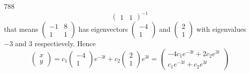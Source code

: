 \documentclass[12pt,a4paper]{article}
\begin{document}
\begin{problem}{788}
\[\begin{pmatrix}
                1& 1
            \end{pmatrix}^{-1}
        \]
        that means $(\begin{smallmatrix}-1& 8\\1& 1\end{smallmatrix})$ has eigenvectors $(\begin{smallmatrix}-4\\1\end{smallmatrix})$ and $(\begin{smallmatrix}2\\1\end{smallmatrix})$ with eigenvalues $-3$ and $3$ respectievely. Hence
        \[
            \begin{pmatrix}
                x\\y
            \end{pmatrix}
            =
            c_1
            \begin{pmatrix}
                -4\\1
            \end{pmatrix}
            e^{-3t}
            +
            c_2
            \begin{pmatrix}
                2\\1
            \end{pmatrix}
            e^{3t}
            =
            \begin{pmatrix}
                -4 c_1 e^{-3t} + 2 c_2 e^{3t}\\
                c_1 e^{-3t} + c_2 e^{3t}
            \end{pmatrix}
        \]
    \end{problem}
\end{document}
